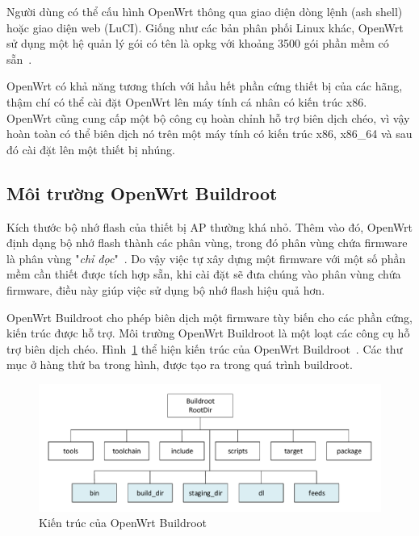 Người dùng có thể cấu hình OpenWrt thông qua giao diện dòng lệnh (ash shell) hoặc giao diện web (LuCI). Giống như các bản phân phối Linux khác, OpenWrt sử dụng một hệ quản lý gói có tên là opkg với khoảng 3500 gói phần mềm có sẵn~\cite{openwrt2017wiki}.

OpenWrt có khả năng tương thích với hầu hết phần cứng thiết bị của các hãng, thậm chí có thể cài đặt OpenWrt lên máy tính cá nhân có kiến trúc x86. OpenWrt cũng cung cấp một bộ công cụ hoàn chỉnh hỗ trợ biên dịch chéo, vì vậy hoàn toàn có thể biên dịch nó trên một máy tính có kiến trúc x86, x86\_64 và sau đó cài đặt lên một thiết bị nhúng.

\subsection{Môi trường OpenWrt Buildroot}
Kích thước bộ nhớ flash của thiết bị AP thường khá nhỏ. Thêm vào đó, OpenWrt định dạng bộ nhớ flash thành các phân vùng, trong đó phân vùng chứa firmware là phân vùng "\emph{chỉ đọc}"~\cite{openwrt2017wiki}. Do vậy việc tự xây dựng một firmware với một số phần mềm cần thiết được tích hợp sẵn, khi cài đặt sẽ đưa chúng vào phân vùng chứa firmware, điều này giúp việc sử dụng bộ nhớ flash hiệu quả hơn.

OpenWrt Buildroot cho phép biên dịch một firmware tùy biến cho các phần cứng, kiến trúc được hỗ trợ. Môi trường OpenWrt Buildroot là một loạt các công cụ hỗ trợ biên dịch chéo. Hình~\ref{fig:openwrt-buildroot} thể hiện kiến trúc của OpenWrt Buildroot~\cite{jin2013openwrt}. Các thư mục ở hàng thứ ba trong hình, được tạo ra trong quá trình buildroot.

\begin{figure}[H]
    \centering
    \includegraphics[width=1.0\textwidth]{openwrt-buildroot}
    \caption{
        \label{fig:openwrt-buildroot}
        Kiến trúc của OpenWrt Buildroot}
\end{figure}

